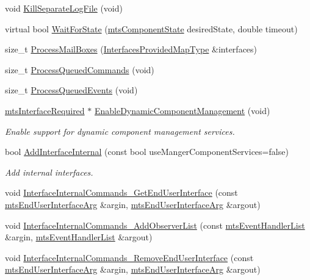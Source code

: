 \begin{DoxyCompactItemize}
void \hyperlink{classmts_component_a88650abb8ed5890c29dc43668f1bccf4}{Kill\+Separate\+Log\+File} (void)
\item 
virtual bool \hyperlink{classmts_component_a936b8338f2c699abbf40faeaed3dff6e}{Wait\+For\+State} (\hyperlink{classmts_component_state}{mts\+Component\+State} desired\+State, double timeout)
\item 
size\+\_\+t \hyperlink{classmts_component_a1012e9c56f4ad1e3e4ff50cf91597f63}{Process\+Mail\+Boxes} (\hyperlink{classmts_component_a1d4117bf122737abe5f943a7ce057ff6}{Interfaces\+Provided\+Map\+Type} \&interfaces)
\item 
size\+\_\+t \hyperlink{classmts_component_a63f22cf3b9b991e8d4762ea563396174}{Process\+Queued\+Commands} (void)
\item 
size\+\_\+t \hyperlink{classmts_component_a9d424fa33b3234ff3d2672b62e9f1675}{Process\+Queued\+Events} (void)
\item 
\hyperlink{classmts_interface_required}{mts\+Interface\+Required} $\ast$ \hyperlink{classmts_component_aa63a28894e3fd44a231924a24d40428a}{Enable\+Dynamic\+Component\+Management} (void)
\begin{DoxyCompactList}\small\item\em Enable support for dynamic component management services. \end{DoxyCompactList}\item 
bool \hyperlink{classmts_component_af24429ddbfe7177fcfaf35482254f917}{Add\+Interface\+Internal} (const bool use\+Manger\+Component\+Services=false)
\begin{DoxyCompactList}\small\item\em Add internal interfaces. \end{DoxyCompactList}\item 
void \hyperlink{classmts_component_a4b1bf49f0edcbbe123e40399f971e494}{Interface\+Internal\+Commands\+\_\+\+Get\+End\+User\+Interface} (const \hyperlink{classmts_end_user_interface_arg}{mts\+End\+User\+Interface\+Arg} \&argin, \hyperlink{classmts_end_user_interface_arg}{mts\+End\+User\+Interface\+Arg} \&argout)
\item 
void \hyperlink{classmts_component_ad9814156d7cd119f30b49671e38bbaf3}{Interface\+Internal\+Commands\+\_\+\+Add\+Observer\+List} (const \hyperlink{classmts_event_handler_list}{mts\+Event\+Handler\+List} \&argin, \hyperlink{classmts_event_handler_list}{mts\+Event\+Handler\+List} \&argout)
\item 
void \hyperlink{classmts_component_ab9c1d9ee9ee050e75b11b839f8516e1c}{Interface\+Internal\+Commands\+\_\+\+Remove\+End\+User\+Interface} (const \hyperlink{classmts_end_user_interface_arg}{mts\+End\+User\+Interface\+Arg} \&argin, \hyperlink{classmts_end_user_interface_arg}{mts\+End\+User\+Interface\+Arg} \&argout)

\end{DoxyCompactItemize}
